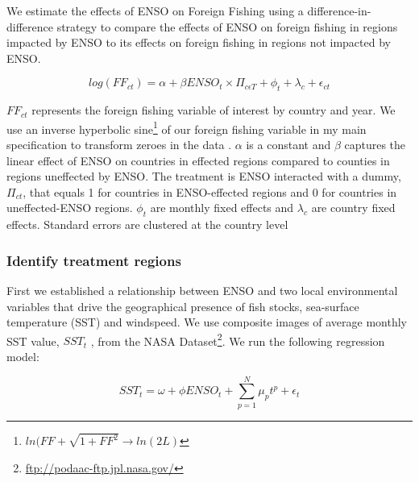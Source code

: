 \documentclass[]{article}
\let\rmarkdownfootnote\footnote%
\def\footnote{\protect\rmarkdownfootnote}
\begin{document}
We estimate the effects of ENSO on Foreign Fishing using a
difference-in-difference strategy to compare the effects of ENSO on
foreign fishing in regions impacted by ENSO to its effects on foreign
fishing in regions not impacted by ENSO.

\[log(FF_{ct}) = \alpha + \beta ENSO_t \times \Pi_{c\epsilon T} + \phi_t + \lambda_c + \epsilon_{ct}\]

\(FF_{ct}\) represents the foreign fishing variable of interest by
country and year. We use an inverse hyperbolic sine\footnote{\(ln(FF + \sqrt{1 + FF^2} \rightarrow ln(2L)\)}
of our foreign fishing variable in my main specification to transform
zeroes in the data \citep{burbidge_1988,card_2017}. \(\alpha\) is a
constant and \(\beta\) captures the linear effect of ENSO on countries
in effected regions compared to counties in regions uneffected by ENSO.
The treatment is ENSO interacted with a dummy, \(\Pi_{ct}\), that equals
1 for countries in ENSO-effected regions and 0 for countries in
uneffected-ENSO regions. \(\phi_t\) are monthly fixed effects and
\(\lambda_c\) are country fixed effects. Standard errors are clustered
at the country level

\hypertarget{identify-treatment-regions}{%
\subsubsection{Identify treatment
regions}\label{identify-treatment-regions}}

First we established a relationship between ENSO and two local
environmental variables that drive the geographical presence of fish
stocks, sea-surface temperature (SST) and windspeed. We use composite
images of average monthly SST value, \(SST_t\) , from the NASA
Dataset\footnote{\url{ftp://podaac-ftp.jpl.nasa.gov/}}. We run the
following regression model:

\[SST_t = \omega + \phi ENSO_t + \sum_{p = 1}^{N}{\mu_pt^p} + \epsilon_t\]
\end{document}
